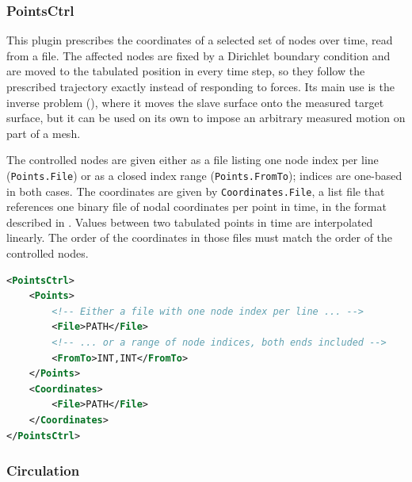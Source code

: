 \subsubsection{PointsCtrl}
\label{settings:PointsCtrl}

This plugin prescribes the coordinates of a selected set of nodes over time, read from a file.
The affected nodes are fixed by a Dirichlet boundary condition and are moved to the tabulated position in every time step, so they follow the prescribed trajectory exactly instead of responding to forces.
Its main use is the inverse problem (), where it moves the slave surface onto the measured target surface, but it can be used on its own to impose an arbitrary measured motion on part of a mesh.

The controlled nodes are given either as a file listing one node index per line (\verb|Points.File|) or as a closed index range (\verb|Points.FromTo|); indices are one-based in both cases.
The coordinates are given by \verb|Coordinates.File|, a list file that references one binary file of nodal coordinates per point in time, in the format described in .
Values between two tabulated points in time are interpolated linearly.
The order of the coordinates in those files must match the order of the controlled nodes.

\begin{lstlisting}[language=XML,caption=.xml settings for the PointsCtrl plugin]
<PointsCtrl>
    <Points>
        <!-- Either a file with one node index per line ... -->
        <File>PATH</File>
        <!-- ... or a range of node indices, both ends included -->
        <FromTo>INT,INT</FromTo>
    </Points>
    <Coordinates>
        <File>PATH</File>
    </Coordinates>
</PointsCtrl>
\end{lstlisting}

\subsubsection{Circulation}
\label{plugin:Circulation}


